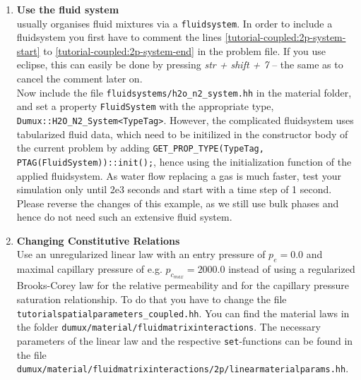 \begin{enumerate}
\item \textbf{Use the \Dumux fluid system} \\
\Dumux usually organises fluid mixtures via a \texttt{fluidsystem}. In order to include a fluidsystem you first have to comment the lines \ref{tutorial-coupled:2p-system-start} to \ref{tutorial-coupled:2p-system-end} in the problem file. If you use eclipse, this can easily be done by pressing \textit{str + shift + 7} -- the same as to cancel the comment later on.\\
Now include the file \texttt{fluidsystems/h2o\_n2\_system.hh} in the material folder, and set a property \texttt{FluidSystem} with the appropriate type, \texttt{Dumux::H2O\_N2\_System<TypeTag>}. However, the complicated fluidsystem uses tabularized fluid data, which need to be initilized in the constructor body of the current problem by adding \texttt{GET\_PROP\_TYPE(TypeTag, PTAG(FluidSystem))::init();}, hence using the initialization function of the applied fluidsystem. As water flow replacing a gas is much faster, test your simulation only until 2e3 seconds and start with a time step of 1 second.\\
Please reverse the changes of this example, as we still use bulk phases and hence do not need such an extensive fluid system.

\item \textbf{Changing Constitutive Relations} \\
  Use an unregularized linear law with an entry pressure of $p_e = 0.0$ and maximal capillary pressure of e.g. $p_{c_{max}} = 2000.0$ instead of using a
 regularized Brooks-Corey law for the
  relative permeability and for the capillary pressure saturation relationship. To do that you have
  to change the file \texttt{tutorialspatialparameters\_coupled.hh}. 
 You can find the material laws in the folder 
  \verb+dumux/material/fluidmatrixinteractions+. The necessary parameters
of the linear law and the respective \texttt{set}-functions can be found
 in the file \\
 \verb+dumux/material/fluidmatrixinteractions/2p/linearmaterialparams.hh+.
 

\end{enumerate}
